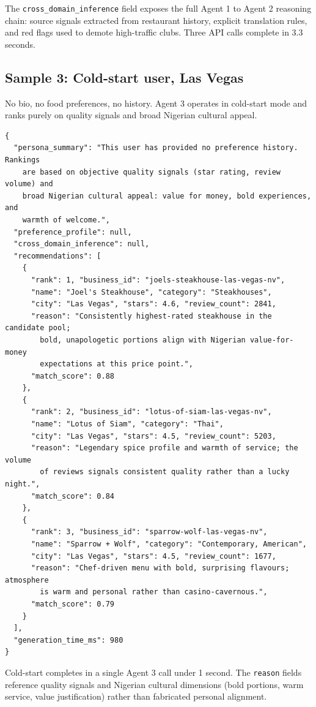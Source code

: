 \documentclass[11pt]{article}
\begin{document}
The \texttt{cross\_domain\_inference} field exposes the full Agent 1 to Agent 2 reasoning chain: source signals extracted from restaurant history, explicit translation rules, and red flags used to demote high-traffic clubs. Three API calls complete in 3.3 seconds.

\subsection{Sample 3: Cold-start user, Las Vegas}

No bio, no food preferences, no history. Agent 3 operates in cold-start mode and ranks purely on quality signals and broad Nigerian cultural appeal.

{\footnotesize\begin{verbatim}
{
  "persona_summary": "This user has provided no preference history. Rankings
    are based on objective quality signals (star rating, review volume) and
    broad Nigerian cultural appeal: value for money, bold experiences, and
    warmth of welcome.",
  "preference_profile": null,
  "cross_domain_inference": null,
  "recommendations": [
    {
      "rank": 1, "business_id": "joels-steakhouse-las-vegas-nv",
      "name": "Joel's Steakhouse", "category": "Steakhouses",
      "city": "Las Vegas", "stars": 4.6, "review_count": 2841,
      "reason": "Consistently highest-rated steakhouse in the candidate pool;
        bold, unapologetic portions align with Nigerian value-for-money
        expectations at this price point.",
      "match_score": 0.88
    },
    {
      "rank": 2, "business_id": "lotus-of-siam-las-vegas-nv",
      "name": "Lotus of Siam", "category": "Thai",
      "city": "Las Vegas", "stars": 4.5, "review_count": 5203,
      "reason": "Legendary spice profile and warmth of service; the volume
        of reviews signals consistent quality rather than a lucky night.",
      "match_score": 0.84
    },
    {
      "rank": 3, "business_id": "sparrow-wolf-las-vegas-nv",
      "name": "Sparrow + Wolf", "category": "Contemporary, American",
      "city": "Las Vegas", "stars": 4.5, "review_count": 1677,
      "reason": "Chef-driven menu with bold, surprising flavours; atmosphere
        is warm and personal rather than casino-cavernous.",
      "match_score": 0.79
    }
  ],
  "generation_time_ms": 980
}
\end{verbatim}}

Cold-start completes in a single Agent 3 call under 1 second. The \texttt{reason} fields reference quality signals and Nigerian cultural dimensions (bold portions, warm service, value justification) rather than fabricated personal alignment.
\end{document}
